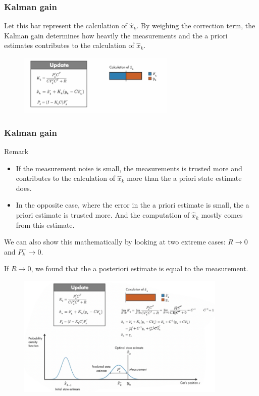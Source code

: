 \documentclass{beamer}
\begin{document}
\begin{frame}
	\frametitle{Kalman gain}
	Let this bar represent the calculation of  $\hat{x}_{k} $. By weighing the correction term, the Kalman gain determines how heavily the measurements and the a priori estimates contributes to the calculation of $\hat{x}_{k} $.
	\begin{figure}
		\centering
		\includegraphics[width=7.5cm]{kf_gain.png}
	\end{figure}
\end{frame}

\begin{frame}
	\frametitle{Kalman gain}
	\begin{block}{Remark}
		\begin{itemize}
			\item  	If the measurement noise is small, the measurements is trusted more and contributes to the calculation of $\hat{x}_{k} $ more than the a priori state estimate does. 
			\item In the opposite case, where the error in the a priori estimate is small, the a priori estimate is trusted more. And the computation of $\hat{x}_{k} $ mostly comes from this estimate.
		\end{itemize}
	\end{block}
We can also show this mathematically by looking at two extreme cases: $R \to 0 $ and $P^-_k  \to 0 $.
\end{frame}
\begin{frame}
	If $R \to 0 $, we found that the a posteriori estimate is equal to the measurement.
	\begin{figure}
		\centering
		\includegraphics[width=10cm]{kf_gain_R0.png}
	\end{figure}
\end{frame}
\end{document}
